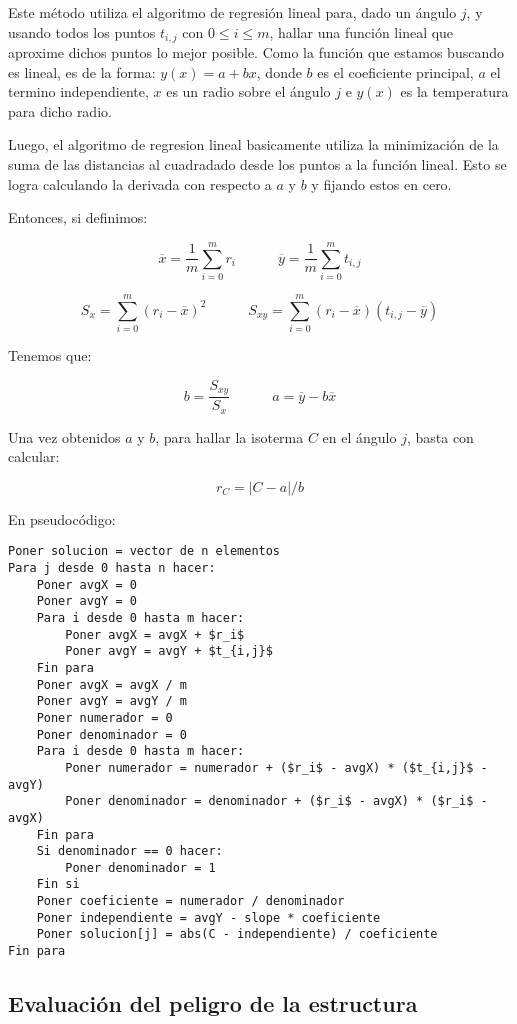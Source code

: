 Este método utiliza el algoritmo de regresión lineal para, dado un ángulo $j$, y usando todos los puntos $t_{i,j}$ con $0 \leq i \leq m$, hallar una función lineal que aproxime dichos puntos lo mejor posible.
Como la función que estamos buscando es lineal, es de la forma: $y(x) = a + bx$, donde $b$ es el coeficiente principal, $a$ el termino independiente, $x$ es un radio sobre el ángulo $j$ e $y(x)$ es la temperatura para dicho radio.

Luego, el algoritmo de regresion lineal basicamente utiliza la minimización de la suma de las distancias al cuadradado desde los puntos a la función lineal. Esto se logra calculando la derivada con respecto a $a$ y $b$ y fijando estos en cero.

Entonces, si definimos:

$$\overline{x} = \frac{1}{m}\sum_{i=0}^{m}{r_i} \quad\quad\quad \overline{y} = \frac{1}{m}\sum_{i=0}^{m}{t_{i,j}}$$

$$S_x = \sum_{i=0}^{m}{(r_i - \overline{x})^2} \quad\quad\quad S_{xy} = \sum_{i=0}^{m}{(r_i - \overline{x})(t_{i,j} - \overline{y})}$$

Tenemos que:

$$b = \frac{S_{xy}}{S_x}  \quad\quad\quad a = \overline{y} - b\overline{x}$$

Una vez obtenidos $a$ y $b$, para hallar la isoterma $C$ en el ángulo $j$, basta con calcular:

$$r_C = |C - a|/b$$

En pseudocódigo:

\begin{lstlisting}[mathescape=true]
Poner solucion = vector de n elementos
Para j desde 0 hasta n hacer:
    Poner avgX = 0
    Poner avgY = 0
    Para i desde 0 hasta m hacer:
        Poner avgX = avgX + $r_i$
        Poner avgY = avgY + $t_{i,j}$
    Fin para
    Poner avgX = avgX / m
    Poner avgY = avgY / m
    Poner numerador = 0
    Poner denominador = 0
    Para i desde 0 hasta m hacer:
        Poner numerador = numerador + ($r_i$ - avgX) * ($t_{i,j}$ - avgY)
        Poner denominador = denominador + ($r_i$ - avgX) * ($r_i$ - avgX)
    Fin para
    Si denominador == 0 hacer:
        Poner denominador = 1
    Fin si
    Poner coeficiente = numerador / denominador
    Poner independiente = avgY - slope * coeficiente
    Poner solucion[j] = abs(C - independiente) / coeficiente
Fin para
\end{lstlisting}

\subsection{Evaluación del peligro de la estructura}

